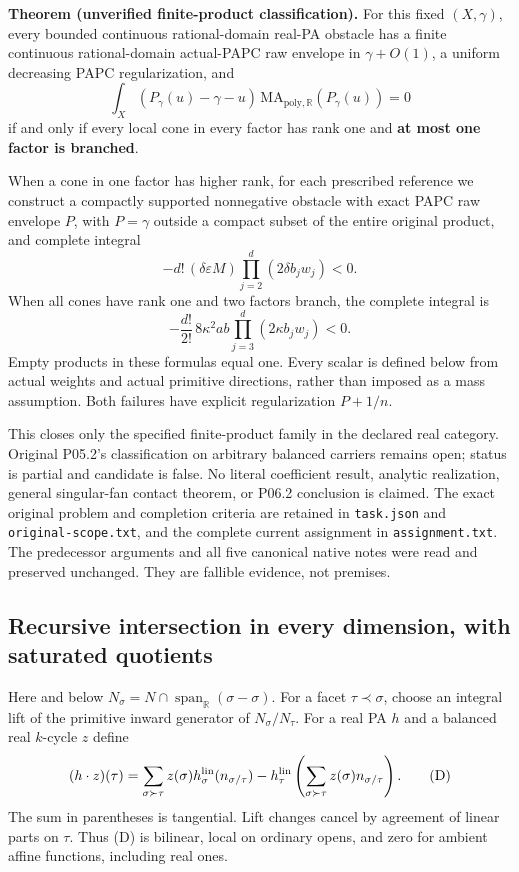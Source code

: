 \documentclass[
  11pt,
]{article}
\begin{document}
\textbf{Theorem (unverified finite-product classification).} For this
fixed \((X,\gamma)\), every bounded continuous rational-domain real-PA
obstacle has a finite continuous rational-domain actual-PAPC raw
envelope in \(\gamma+O(1)\), a uniform decreasing PAPC regularization,
and \[
       \int_X(P_\gamma(u)-\gamma-u)\,
                  \mathrm{MA}_{\mathrm{poly},\mathbb{R}}(P_\gamma(u))=0
 \tag{C}
\] if and only if every local cone in every factor has rank one and
\textbf{at most one factor is branched}.

When a cone in one factor has higher rank, for each prescribed reference
we construct a compactly supported nonnegative obstacle with exact PAPC
raw envelope \(P\), with \(P=\gamma\) outside a compact subset of the
entire original product, and complete integral \[
 -d!\,(\delta\varepsilon M)\prod_{j=2}^d(2\delta b_jw_j)<0.
 \tag{H}
\] When all cones have rank one and two factors branch, the complete
integral is \[
 -\frac{d!}{2!}\,8\kappa^2ab\prod_{j=3}^d(2\kappa b_jw_j)<0.
 \tag{T}
\] Empty products in these formulas equal one. Every scalar is defined
below from actual weights and actual primitive directions, rather than
imposed as a mass assumption. Both failures have explicit regularization
\(P+1/n\).

This closes only the specified finite-product family in the declared
real category. Original P05.2's classification on arbitrary balanced
carriers remains open; status is partial and candidate is false. No
literal coefficient result, analytic realization, general singular-fan
contact theorem, or P06.2 conclusion is claimed. The exact original
problem and completion criteria are retained in \texttt{task.json} and
\texttt{original-scope.txt}, and the complete current assignment in
\texttt{assignment.txt}. The predecessor arguments and all five
canonical native notes were read and preserved unchanged. They are
fallible evidence, not premises.

\subsection{Recursive intersection in every dimension, with saturated
quotients}\label{recursive-intersection-in-every-dimension-with-saturated-quotients}

Here and below
\(N_\sigma=N\cap\operatorname{span}_{\mathbb{R}}(\sigma-\sigma)\). For a
facet \(\tau\prec\sigma\), choose an integral lift of the primitive
inward generator of \(N_\sigma/N_\tau\). For a real PA \(h\) and a
balanced real \(k\)-cycle \(z\) define \[
 (h\cdot z)(\tau)=\sum_{\sigma\succ\tau}z(\sigma)h_\sigma^{\rm lin}(n_{\sigma/\tau})
       -h_\tau^{\rm lin}\left(\sum_{\sigma\succ\tau}z(\sigma)n_{\sigma/\tau}\right).
 \tag{D}
\] The sum in parentheses is tangential. Lift changes cancel by
agreement of linear parts on \(\tau\). Thus (D) is bilinear, local on
ordinary opens, and zero for ambient affine functions, including real
ones.
\end{document}
